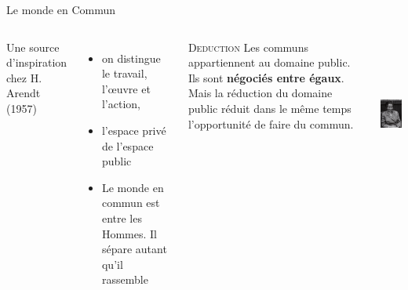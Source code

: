 \documentclass[newPxFont]{beamer}
\begin{document}
\begin{frame}[c]{Le monde en Commun}
  \vspace{-1cm}
  \begin{columns}[onlytextwidth,T]
    \column{\dimexpr\linewidth-30mm-5mm}
      Une source d'inspiration chez H. Arendt (1957)
      \begin{itemize}
        \item on distingue le travail, l'œuvre et l'action, 
        \item l'espace privé de l'espace public
        \item Le monde en commun est entre les Hommes. Il sépare autant qu'il rassemble
      \end{itemize}
  
    \small{
      \begin{alertblock}{\textsc{Deduction}}
        Les communs appartiennent au domaine public. Ils sont \textbf{négociés entre égaux}. Mais la réduction du domaine public réduit dans le même temps l’opportunité de faire du commun.
      \end{alertblock}
    }
  \column{30mm}
    \includegraphics[height=5cm]{img/Hannah_Arendt.jpg}
    \end{columns}
  \end{frame}
\end{document}

